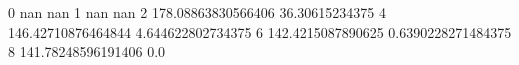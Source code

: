 0 nan nan
1 nan nan
2 178.08863830566406 36.30615234375
4 146.42710876464844 4.644622802734375
6 142.4215087890625 0.6390228271484375
8 141.78248596191406 0.0
